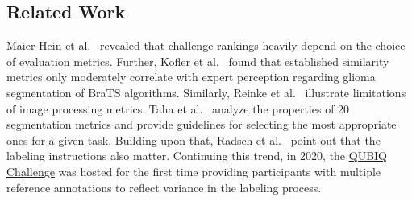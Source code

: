\subsection{Related Work}
Maier-Hein et al.\ \citep{maier2018rankings} revealed that challenge rankings heavily depend on the choice of evaluation metrics.
Further, Kofler et al.\ \citep{kofler2021we} found that established similarity metrics only moderately correlate with expert perception regarding glioma segmentation of BraTS algorithms.
Similarly, Reinke et al.\ \citep{reinke2021common} illustrate limitations of image processing metrics.
Taha et al.\ \citep{taha2015metrics} analyze the properties of 20 segmentation metrics and provide guidelines for selecting the most appropriate ones for a given task.
Building upon that, Radsch et al.\ \citep{radsch2022labeling} point out that the labeling instructions also matter.
Continuing this trend, in 2020, the \href{http://www.https://qubiq.grand-challenge.org}{QUBIQ Challenge} was hosted for the first time providing participants with multiple reference annotations to reflect variance in the labeling process.

